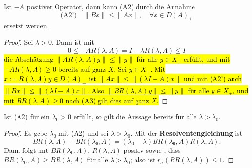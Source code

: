 \begin{bem}\label{stärkere Annahme (A2)}
Ist $-A$ positiver Operator, dann kann (A2) durch die Annahme
\begin{equation*}
\text{(A2')} \quad \|Bx\|\leq \|Ax\|,\quad \forall x\in D(A)_+
\end{equation*}
ersetzt werden. 
\end{bem}

\begin{proof}
\par
Sei $\lambda >0$. Dann ist mit
\begin{equation*}
0\leq -AR(\lambda, A)=I-\lambda R(\lambda, A)\leq I
\end{equation*}
\hl{die Abschätzung $\|AR(\lambda, A)y\|\leq \|y\|$ für alle $y\in X_+$ erfüllt, und mit $-AR(\lambda, A)\geq0$ bereits auf ganz $X$. Sei $y\in X_+$. Mit $x:=R(\lambda, A)y\in D(A)_+$ ist  $\|Ax\|\leq \|(\lambda I- A)x\|$ und mit (A2') auch $\|Bx\|\leq \|(\lambda I-A)x\|$. Also $\|BR(\lambda, A)y\|\leq \|y\|$ für alle $y\in X_+$, und mit $BR(\lambda, A)\geq0$ nach (A3) gilt dies auf ganz $X$.}
\end{proof}

\begin{bem}\label{BR(lambda, A) fallend}
Ist (A2) für ein $\lambda_0>0$ erfüllt, so gilt die Aussage bereits für alle $\lambda > \lambda_0$. 
\end{bem}

\begin{proof}
\par
Es gebe $\lambda_0$ mit (A2) und sei $\lambda > \lambda_0$. Mit der \index{}\textbf{Resolventengleichung} ist
\begin{equation*}
BR(\lambda, A)-BR(\lambda_0, A)=(\lambda_0 - \lambda)BR(\lambda_0, A)R(\lambda, A).
\end{equation*}
Dann folgt mit $BR(\lambda_0, A)$, $R(\lambda,A)$ positiv sowie , dass $BR(\lambda_0, A)\geq BR(\lambda,A)$ für alle $\lambda >\lambda_0$; also ist $r_\sigma(BR(\lambda, A))\leq 1$.
\end{proof}

